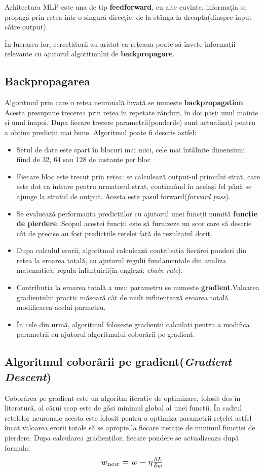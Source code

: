 Arhitectura MLP este una de tip \textbf{feedforward}, cu alte cuvinte, informația se propagă prin rețea intr-o singură direcție, de la stânga la dreapta(dinspre input către output).

În lucrarea lor, cercetătorii au arătat ca rețeaua poate să învețe informații relevante cu ajutorul algoritmului de \textbf{backpropagare}. 
\subsection{Backpropagarea}

Algoritmul prin care o rețea neuronală învață se numește \textbf{backpropagation}. Acesta presupune trecerea prin rețea în repetate rânduri, în doi pași: unul inainte și unul înapoi. Dupa fiecare trecere parametrii(ponderile) sunt actualizați pentru a obține predicții mai bune.
Algoritmul poate fi descris astfel:
\begin{itemize}
    \item Setul de date este spart în blocuri mai mici, cele mai întâlnite dimensiuni fiind de 32, 64 sau 128 de instanțe per bloc
    \item Fiecare bloc este trecut prin rețea: se calculează output-ul primului strat, care este dat ca intrare pentru urmatorul strat, continuând în același fel până se ajunge la stratul de output. Acesta este pasul forward(\textit{forward pass}).
    \item Se evaluează performanța predicțiilor cu ajutorul unei funcții numită \textbf{funcție de pierdere}. Scopul acestei funcții este să furnizeze un scor care să descrie cât de precise au fost predicțiile rețelei față de rezultatul dorit. 
    \item Dupa calculul erorii, algoritmul calculează contribuția fiecărei ponderi din rețea la eroarea totală, cu ajutorul regulii fundamentale din analiza matematică: regula înlănțuirii(în engleză: \textit{chain rule}).
    \item Contribuția la eroarea totală a unui parametru se numește \textbf{gradient}.Valoarea gradientului practic măsoară cât de mult influențează eroarea totală modificarea acelui parmetru.
    \item În cele din urmă, algoritmul folosește gradienții calculați pentru a modifica parametrii cu ajutorul algoritmului coborârii pe gradient.
\end{itemize}
\newpage


\subsection{Algoritmul coborârii pe gradient(\textit{Gradient Descent})}
\label{ch:Gradient Descent}
Coborârea pe gradient este un algoritm iterativ de optimizare, folosit des în literatură, al cărui scop este de găsi minimul global al unei funcții. În cadrul rețelelor neuronale acesta este folosit pentru a optimiza parametrii rețelei astfel încat valoarea erorii totale să se apropie la fiecare iterație de minimul funcției de pierdere. Dupa calcularea gradienților, fiecare pondere se actualizeaza după formula: 
\[
    \scalebox{1.2}{$w_{\text new} = w - \eta \frac{\delta L}{\delta w}$}
\]

